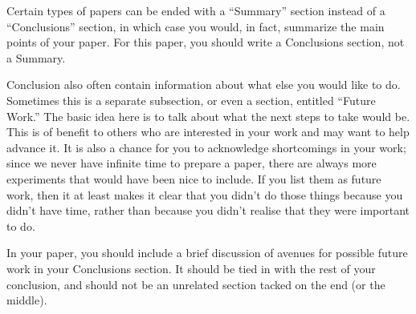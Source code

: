 \documentclass[12pt, letterpaper]{article}
\begin{document}
Certain types of papers can be ended with a ``Summary'' section instead of a
``Conclusions'' section, in which case you would, in fact, summarize the main
points of your paper.  For this paper, you should write a Conclusions section,
not a Summary.

Conclusion also often contain information about what else you would like
to do.  Sometimes this is a separate subsection, or even a section, entitled
``Future Work.''  The basic idea here is to talk about what the next steps to
take would be.  This is of benefit to others who are interested in your
work and may want to help advance it.  It is also a chance for you to
acknowledge shortcomings in your work; since we never have infinite time to
prepare a paper, there are always more experiments that would have been nice to
include.  If you list them as future work, then it at least makes it clear that
you didn't do those things because you didn't have time, rather than because you
didn't realise that they were important to do.

In your paper, you should include a brief discussion of avenues for possible
future work in your Conclusions section.  It should be tied in with the rest of
your conclusion, and should not be an unrelated section tacked on the end (or
the middle).





\end{document}
